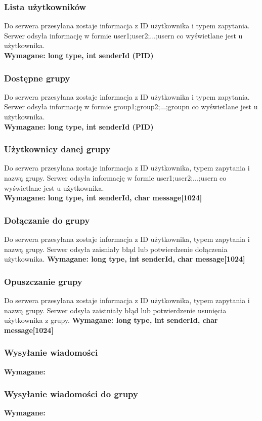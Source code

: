 \documentclass[11pt]{article}
\begin{document}
	\subsubsection{Lista użytkowników}
	Do serwera przesyłana zostaje informacja z ID użytkownika i typem zapytania. Serwer odsyła informację w formie user1;user2;...;usern co wyświetlane jest u użytkownika.\\
	\textbf{Wymagane: long type, int senderId (PID)}
	\subsubsection{Dostępne grupy}
	Do serwera przesyłana zostaje informacja z ID użytkownika i typem zapytania. Serwer odsyła informację w formie group1;group2;...;groupn co wyświetlane jest u użytkownika.\\
	\textbf{Wymagane: long type, int senderId (PID)}
	\subsubsection{Użytkownicy danej grupy}
	Do serwera przesyłana zostaje informacja z ID użytkownika, typem zapytania i nazwą grupy. Serwer odsyła informację w formie user1;user2;...;usern co wyświetlane jest u użytkownika.\\
	\textbf{Wymagane: long type, int senderId, char message[1024]}
	\subsubsection{Dołączanie do grupy}
	Do serwera przesyłana zostaje informacja z ID użytkownika, typem zapytania i nazwą grupy. Serwer odsyła zaisniały błąd lub potwierdzenie dołączenia użytkownika.
	\textbf{Wymagane: long type, int senderId, char message[1024]}
	\subsubsection{Opuszczanie grupy}
	Do serwera przesyłana zostaje informacja z ID użytkownika, typem zapytania i nazwą grupy. Serwer odsyła zaistniały błąd lub potwierdzenie usunięcia użytkownika z grupy.
	\textbf{Wymagane: long type, int senderId, char message[1024]}
	\subsubsection{Wysyłanie wiadomości}
	\textbf{Wymagane:}
	\subsubsection{Wysyłanie wiadomości do grupy}
	\textbf{Wymagane:}
\end{document}
